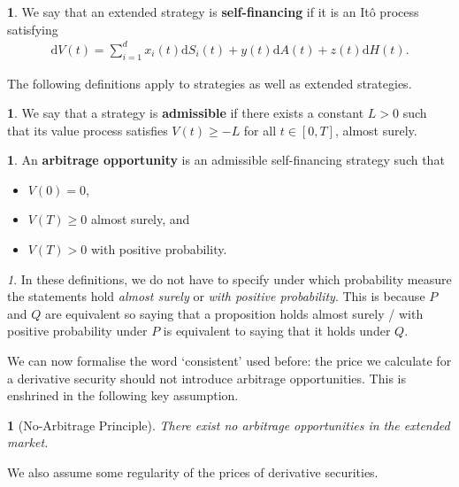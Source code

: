 \documentclass[english]{article}
\numberwithin{equation}{section}
\numberwithin{figure}{section}
\theoremstyle{bolddescit}
\theoremstyle{definition}
\newtheorem{definition}[theorem]{\protect\definitionname}
\theoremstyle{definition}
\theoremstyle{plain}
\theoremstyle{plain}
\theoremstyle{bolddesc}
\newtheorem{assumption}[theorem]{\protect\assumptionname}
\theoremstyle{plain}
\theoremstyle{remark}
\newtheorem{remark}[theorem]{\protect\remarkname}
\providecommand{\assumptionname}{Assumption}
\providecommand{\definitionname}{Definition}
\providecommand{\remarkname}{Remark}
\begin{document}
\begin{definition}
  We say that an extended strategy is \textbf{self-financing} if it is an It\^o process satisfying
  \begin{align*}
    \mathrm{d}V(t) = \sum_{i=1}^d x_i(t) \mathrm{d}S_i(t) + y(t) \mathrm{d}A(t) + z(t) \mathrm{d}H(t).
  \end{align*}
\end{definition}

The following definitions apply to strategies as well as extended strategies.

\begin{definition}
  We say that a strategy is \textbf{admissible} if there exists a constant $L > 0$ such that its value process satisfies $V(t) \ge -L$ for all $t \in [0,T]$, almost surely.
\end{definition}

\begin{definition}
  An \textbf{arbitrage opportunity} is an admissible self-financing strategy such that
  \begin{itemize}
    \item $V(0) = 0$,
    \item $V(T) \ge 0$ almost surely, and
    \item $V(T) > 0$ with positive probability.
  \end{itemize}
\end{definition}

\begin{remark}
  In these definitions, we do not have to specify under which probability measure the statements hold \textit{almost surely} or \textit{with positive probability}. This is because $P$ and $Q$ are equivalent so saying that a proposition holds almost surely / with positive probability under $P$ is equivalent to saying that it holds under $Q$.
\end{remark}

We can now formalise the word `consistent' used before: the price we calculate for a derivative security should not introduce arbitrage opportunities. This is enshrined in the following key assumption.

\begin{assumption}[No-Arbitrage Principle]\label{ass:no-arbitrage-principle}
  There exist no arbitrage opportunities in the extended market.
\end{assumption}

We also assume some regularity of the prices of derivative securities.
\end{document}
